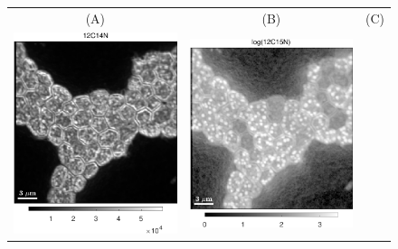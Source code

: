 \begin{figure}[!ht]
\centering
\def\sc{0.45}
\begin{tabular}{ccc}
(A) & (B) & (C) \\
\includegraphics[scale=\sc, valign=t]{figs6/12C14N}
&
\includegraphics[scale=\sc, valign=t]{figs6/12C15N}

\end{tabular}
\end{figure}
